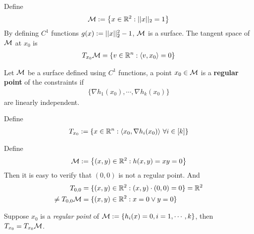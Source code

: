 \documentclass{article}
\begin{document}
   	\begin{example}
   		Define 
   		\begin{align}
   			\mathcal{{M}} := \left\{x \in \mathbb{R}^2: \vert \vert {x} \vert \vert_2 = 1 \right\}
   		\end{align}
   		By defining $C^1$ functions $g(x) := \vert \vert {x} \vert \vert^2_2  - 1$, $\mathcal{{M}}$ is a surface. The tangent space of $\mathcal{{M}}$ at $x_0$ is
   		\begin{align}
   			T_{x_0} \mathcal{{M}} = \left \{
   			v \in \mathbb{R}^n:
   			\langle {v}, {x_0} \rangle = 0
   			\right \}
   		\end{align}
   	\end{example}
   	
   	\begin{definition}
   		Let $\mathcal{{M}}$ be a surface defined using $C^1$ functions, a point $x_0 \in \mathcal{{M}}$ is a \textbf{regular point} of the constraints if 
   		\begin{align}
   			\{\nabla h_1(x_0), \cdots, \nabla h_k(x_0)\}
   		\end{align}
   		are linearly independent.
   	\end{definition}
   	
   	\begin{notation}
   		Define
   		\begin{align}
   			T_{x_0} := \{x \in \R^n: \inner{x_0}{\nabla h_i(x_0)}\ \forall i \in [k]\}
   		\end{align}
   	\end{notation}
   	
   	\begin{example}
   		Define
   		\begin{align}
   			\mathcal{{M}} := \left \{
   			(x, y) \in \mathbb{R}^2:
   			h(x,y) = xy = 0
   			\right \}
   		\end{align}
   		Then it is easy to verify that $(0,0)$ is not a regular point. And
   		\begin{align}
   			T_{0,0} &= \{(x, y) \in \mathbb{R}^2: (x, y) \cdot (0,0) = 0\} = \mathbb{R}^2 \\
   			\neq T_{0,0}\mathcal{{M}} &= \{(x, y) \in \mathbb{R}^2: x = 0 \lor y = 0\}
   		\end{align}
   	\end{example}
   	
   	\begin{theorem}
   		Suppose $x_0$ is a \emph{regular point} of $\mathcal{{M}} := \{h_i(x) = 0, i=1,\cdots,k\}$, then $T_{x_0} = T_{x_0} \mathcal{{M}}$.
   	\end{theorem}
   	
\end{document}
